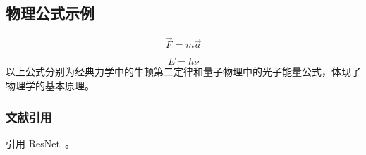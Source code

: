 \subsection{物理公式示例}
\begin{equation}
\vec{F} = m \vec{a}
\end{equation}

\begin{equation}
E = h \nu
\end{equation}
以上公式分别为经典力学中的牛顿第二定律和量子物理中的光子能量公式，体现了物理学的基本原理。



\subsubsection{文献引用}

引用 ResNet~\cite{he2016deep}。

